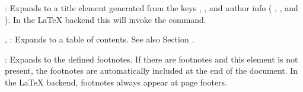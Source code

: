 \documentclass{book}
\begin{document}
\begin{mdUl}[class={list-star,loose},data-line={2027}]%
\begin{mdLi}[data-line={2027}]%
\begin{mdP}[data-line={2027}]%
{}\mdCode[class={code,code1}]{[TITLE]}%
{}: Expands to a title element generated from the%
{}{\mdNbsp}%
{} 
  keys %
{}%
{},
{}%
{}, %
{}%
{} and author info (%
{}%
{}, %
{}%
{}, and %
{}%
{}).
  In the LaTeX backend this will invoke the %
{}%
{} command.%
\end{mdP}%
\end{mdLi}%
\begin{mdLi}[data-line={2032}]%
\begin{mdP}[data-line={2032}]%
{}\mdCode[class={code,code1}]{[TOC]}%
{}, %
{}\mdCode[class={code,code1}]{[TOC=}%
{}%
{}\mdCode[class={code,code1}]{]}%
{}: Expands to a table of contents. See also Section%
{}{\mdNbsp}%
{}.%
\end{mdP}%
\end{mdLi}%
\begin{mdLi}[data-line={2034}]%
\begin{mdP}[data-line={2034}]%
{}\mdCode[class={code,code1}]{[FOOTNOTES]}%
{}: Expands to the defined footnotes. If there are footnotes and this element
  is not present, the footnotes are automatically included at the end of the document.
  In the LaTeX backend, footnotes always appear at page footers.%
\end{mdP}%
\end{mdLi}%
\begin{mdLi}[data-line={2038}]%
\begin{mdP}[data-line={2038}]%
{}\mdCode[class={code,code1}]{[INCLUDE=}%
{}%

\end{mdP}
\end{mdLi}
\end{mdUl}
\end{document}

